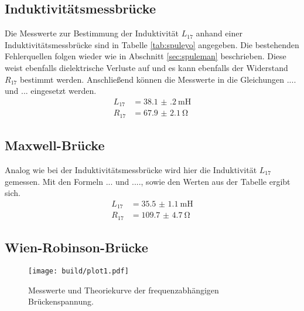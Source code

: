 \subsection{Induktivitätsmessbrücke}
Die Messwerte zur Bestimmung der Induktivität $L_{17}$ anhand einer Induktivitätsmessbrücke sind in Tabelle \ref{tab:spuleyo} angegeben. Die bestehenden Fehlerquellen
folgen wieder wie in Abschnitt \ref{sec:spuleman} beschrieben. Diese weist ebenfalls dielektrische Verluste 
auf und es kann ebenfalls der Widerstand $R_{17}$ bestimmt werden. Anschließend können die Messwerte in die Gleichungen .... und ... eingesetzt werden.
\begin{align}
L_{17} &= \SI{38.1(2)}{\milli\henry} \\
R_{17} &= \SI{67.9(21)}{\ohm} 
\end{align}

\subsection{Maxwell-Brücke}
Analog wie bei der Induktivitätsmessbrücke wird hier die Induktivität $L_{17}$ gemessen. Mit den Formeln ... und ...., sowie den Werten aus der Tabelle ergibt sich.
\begin{align}
    L_{17} &= \SI{35.5(11)}{\milli\henry} \\
    R_{17} &= \SI{109.7(47)}{\ohm} 
\end{align}


\subsection{Wien-Robinson-Brücke}

\begin{figure}
    \centering
    \texttt{[image: build/plot1.pdf]}
    \caption{Messwerte und Theoriekurve der frequenzabhängigen Brückenspannung.} 
    \label{fig:plot1}
\end{figure}